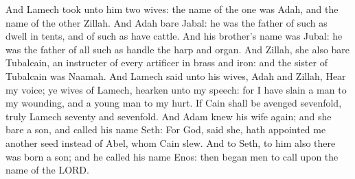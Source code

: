 \begin{biblechapter}
\verse And Lamech took unto him two wives: the name of the one was Adah, and the name of the other Zillah.
\verse And Adah bare Jabal: he was the father of such as dwell in tents, and of such as have cattle.
\verse And his brother's name was Jubal: he was the father of all such as handle the harp and organ.
\verse And Zillah, she also bare Tubalcain, an instructer of every artificer in brass and iron: and the sister of Tubalcain was Naamah.
\verse And Lamech said unto his wives, Adah and Zillah, Hear my voice; ye wives of Lamech, hearken unto my speech: for I have slain a man to my wounding, and a young man to my hurt.
\verse If Cain shall be avenged sevenfold, truly Lamech seventy and sevenfold.
\verse And Adam knew his wife again; and she bare a son, and called his name Seth: For God, said she, hath appointed me another seed instead of Abel, whom Cain slew.
\verse And to Seth, to him also there was born a son; and he called his name Enos: then began men to call upon the name of the LORD.
\end{biblechapter}

